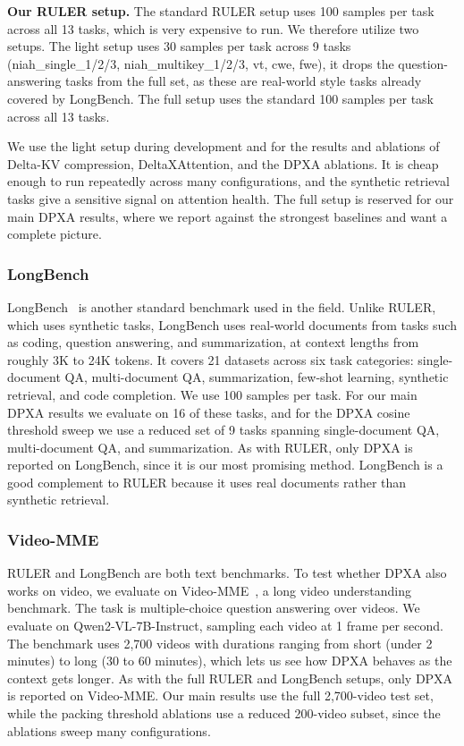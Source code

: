 \textbf{Our RULER setup.} The standard RULER setup uses 100 samples per task across all 13 tasks, which is very expensive to run. We therefore utilize two setups. The light setup uses 30 samples per task across 9 tasks (niah\_single\_1/2/3, niah\_multikey\_1/2/3, vt, cwe, fwe), it drops the question-answering tasks from the full set, as these are real-world style tasks already covered by LongBench. The full setup uses the standard 100 samples per task across all 13 tasks.

We use the light setup during development and for the results and ablations of Delta-KV compression, DeltaXAttention, and the DPXA ablations. It is cheap enough to run repeatedly across many configurations, and the synthetic retrieval tasks give a sensitive signal on attention health. The full setup is reserved for our main DPXA results, where we report against the strongest baselines and want a complete picture.

\subsubsection{LongBench}

LongBench~\cite{bai2024longbench} is another standard benchmark used in the field. Unlike RULER, which uses synthetic tasks, LongBench uses real-world documents from tasks such as coding, question answering, and summarization, at context lengths from roughly 3K to 24K tokens. It covers 21 datasets across six task categories: single-document QA, multi-document QA, summarization, few-shot learning, synthetic retrieval, and code completion. We use 100 samples per task. For our main DPXA results we evaluate on 16 of these tasks, and for the DPXA cosine threshold sweep we use a reduced set of 9 tasks spanning single-document QA, multi-document QA, and summarization. As with RULER, only DPXA is reported on LongBench, since it is our most promising method. LongBench is a good complement to RULER because it uses real documents rather than synthetic retrieval.

\subsubsection{Video-MME}

RULER and LongBench are both text benchmarks. To test whether DPXA also works on video, we evaluate on Video-MME~\cite{fu2024videomme}, a long video understanding benchmark. The task is multiple-choice question answering over videos. We evaluate on Qwen2-VL-7B-Instruct, sampling each video at 1 frame per second. The benchmark uses 2,700 videos with durations ranging from short (under 2 minutes) to long (30 to 60 minutes), which lets us see how DPXA behaves as the context gets longer. As with the full RULER and LongBench setups, only DPXA is reported on Video-MME. Our main results use the full 2,700-video test set, while the packing threshold ablations use a reduced 200-video subset, since the ablations sweep many configurations.

